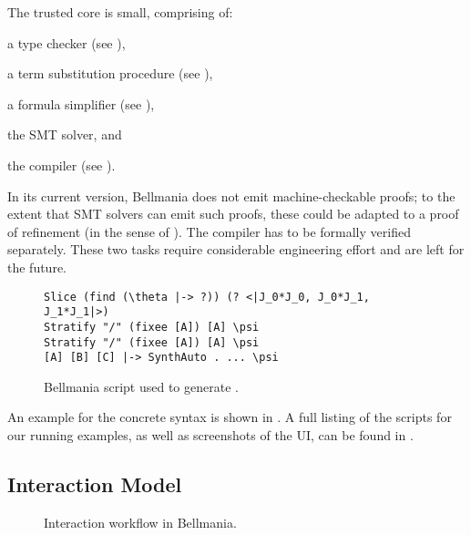 \cbstart{}%
The trusted core is small, comprising of:
\begin{enumerate*}[label=(\textit{\alph*})]
 \item a type checker (see ), 
 \item a term substitution procedure (see ),
 \item a formula simplifier (see ),
 \item the SMT solver, and
 \item the compiler (see ).
\end{enumerate*}
In its current version, Bellmania does not emit machine-checkable
proofs; to the extent that SMT solvers can emit such proofs,
these could be adapted to a proof of refinement (in the sense of \cite{POPL15/Delaware}).
The compiler has to be formally verified separately.
These two tasks require considerable engineering effort and are left for the future.
\cbend

\begin{figure}
\vspace{-.5em}%
\begin{lstlisting}[language=bellmania]
Slice (find (\theta |-> ?)) (? <|J_0*J_0, J_0*J_1, J_1*J_1|>)
Stratify "/" (fixee [A]) [A] \psi
Stratify "/" (fixee [A]) [A] \psi
[A] [B] [C] |-> SynthAuto . ... \psi
\end{lstlisting}
\caption{\label{overview:script}
  Bellmania script used to generate .}
\end{figure}

An example for the concrete syntax is shown in .
A full listing of the scripts for our running examples,
as well as screenshots of the UI, can be found
in .

\subsection{Interaction Model}

\begin{figure}[b!]
\caption{\label{overview:flow}
  Interaction workflow in Bellmania.}
\end{figure}

